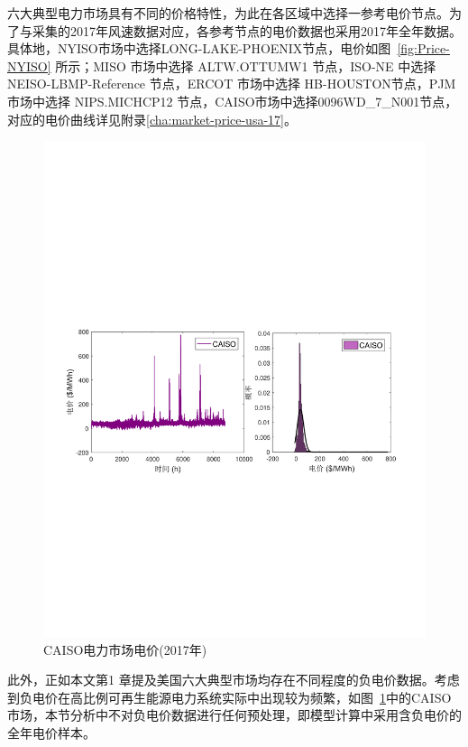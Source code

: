六大典型电力市场具有不同的价格特性，为此在各区域中选择一参考电价节点。为了与采集的2017年风速数据对应，各参考节点的电价数据也采用2017年全年数据。具体地，NYISO市场中选择LONG-LAKE-PHOENIX节点，电价如图~\ref{fig:Price-NYISO} 所示；MISO 市场中选择 ALTW.OTTUMW1 节点，ISO-NE 中选择 NEISO-LBMP-Reference 节点，ERCOT 市场中选择 HB-HOUSTON节点，PJM市场中选择 NIPS.MICHCP12 节点，CAISO市场中选择0096WD\_7\_N001节点，对应的电价曲线详见附录\ref{cha:market-price-usa-17}。

\begin{figure}[!htp] %
  \centering
  \includegraphics[scale=0.78]{figures/Chap5-15-Price-CAISO.pdf}
  \caption{CAISO电力市场电价(2017年)}
  \label{fig:Price-CAISO}
\end{figure}

此外，正如本文第1 章提及美国六大典型市场均存在不同程度的负电价数据。考虑到负电价在高比例可再生能源电力系统实际中出现较为频繁，如图~\ref{fig:Price-CAISO}中的CAISO 市场，本节分析中不对负电价数据进行任何预处理，即模型计算中采用含负电价的全年电价样本。

